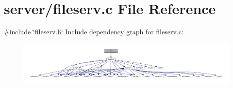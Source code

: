 \section{server/fileserv.c File Reference}
\label{fileserv_8c}
{\ttfamily \#include \char`\"{}fileserv.\+h\char`\"{}}\newline
Include dependency graph for fileserv.\+c\+:
\nopagebreak
\begin{figure}[H]
\begin{center}
\leavevmode
\includegraphics[width=350pt]{fileserv_8c__incl}
\end{center}
\end{figure}
